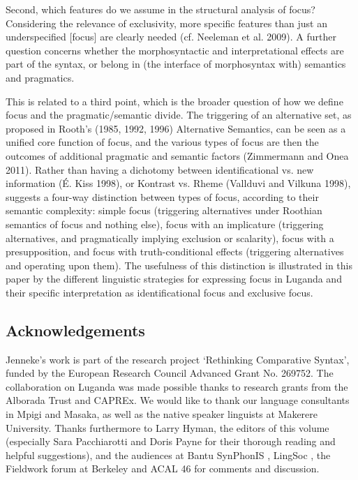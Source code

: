 \documentclass[output=paper]{langsci/langscibook}
\begin{document}
Second, which features do we assume in the structural analysis of focus? Considering the relevance of exclusivity, more specific features than just an underspecified [focus] are clearly needed (cf. Neeleman et al. 2009). A further question concerns whether the morphosyntactic and interpretational effects are part of the syntax, or belong in (the interface of morphosyntax with) semantics and pragmatics.

This is related to a third point, which is the broader question of how we define focus and the pragmatic/semantic divide. The triggering of an alternative set, as proposed in Rooth’s (1985, 1992, 1996) Alternative Semantics, can be seen as a unified core function of focus, and the various types of focus are then the outcomes of additional pragmatic and semantic factors (Zimmermann and Onea 2011). Rather than having a dichotomy between identificational vs. new information (É. Kiss 1998), or Kontrast vs. Rheme (Vallduvi and Vilkuna 1998), \citet{Bazalgette2015} suggests a four-way distinction between types of focus, according to their semantic complexity: simple focus (triggering alternatives under Roothian semantics of focus and nothing else), focus with an implicature (triggering alternatives, and pragmatically implying exclusion or scalarity), focus with a presupposition, and focus with truth-conditional effects (triggering alternatives and operating upon them). The usefulness of this distinction is illustrated in this paper by the different linguistic strategies for expressing focus in Luganda and their specific interpretation as identificational focus and exclusive focus.

\subsection{Acknowledgements}

Jenneke’s work is part of the research project ‘Rethinking Comparative Syntax’, funded by the European Research Council Advanced Grant No. 269752. The collaboration on Luganda was made possible thanks to research grants from the Alborada Trust and CAPREx. We would like to thank our language consultants in Mpigi and Masaka, as well as the native speaker linguists at Makerere University. Thanks furthermore to Larry Hyman, the editors of this volume (especially Sara Pacchiarotti and Doris Payne for their thorough reading and helpful suggestions), and the audiences at Bantu SynPhonIS \citep{November2014}, LingSoc \citep{February2015}, the Fieldwork forum at Berkeley \citep{February2015} and ACAL 46 \citep{March2015} for comments and discussion.
\end{document}
